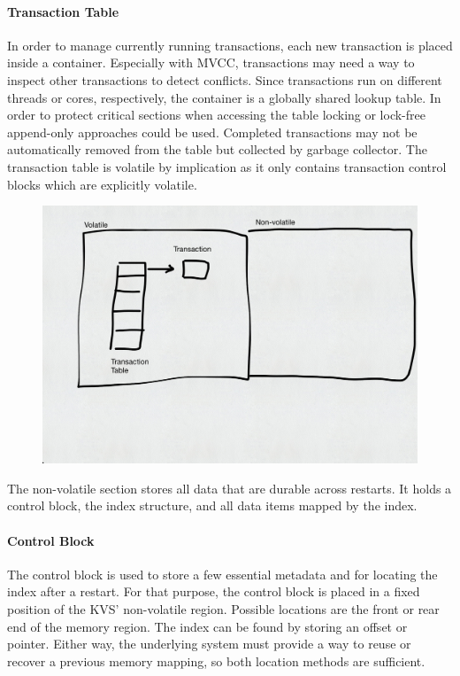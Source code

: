 \paragraph{Transaction Table}

In order to manage currently running transactions, each new transaction is
placed inside a container. Especially with MVCC, transactions may need a way to
inspect other transactions to detect conflicts. Since transactions run on
different threads or cores, respectively, the container is a globally shared
lookup table. In order to protect critical sections when accessing the table
locking or lock-free append-only approaches could be used. Completed
transactions may not be automatically removed from the table but collected by
garbage collector. The transaction table is volatile by implication as it only
contains transaction control blocks which are explicitly volatile.

\begin{figure}[!ht]
    \centering
    \includegraphics[width=\textwidth]{figures/drafts/concept-struct-volatile.pdf}
    \caption{}
    \label{fig:concept-struct-volatile}
\end{figure}

The non-volatile section stores all data that are durable across restarts. It
holds a control block, the index structure, and all data items mapped by the
index.

\paragraph{Control Block}

The control block is used to store a few essential metadata and for locating
the index after a restart. For that purpose, the control block is placed in a
fixed position of the KVS' non-volatile region. Possible locations are the front
or rear end of the memory region. The index can be found by storing an offset or
pointer. Either way, the underlying system must provide a way to reuse or
recover a previous memory mapping, so both location methods are sufficient.

